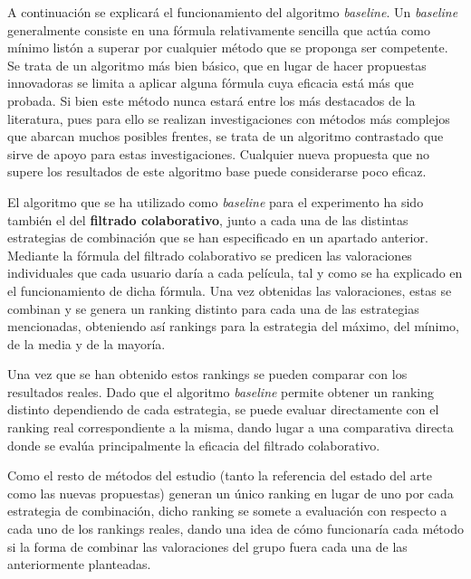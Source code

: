 A continuación se explicará el funcionamiento del algoritmo \textit{baseline}. Un \textit{baseline} generalmente consiste en una fórmula relativamente sencilla que actúa como mínimo listón a superar por cualquier método que se proponga ser competente. Se trata de un algoritmo más bien básico, que en lugar de hacer propuestas innovadoras se limita a aplicar alguna fórmula cuya eficacia está más que probada. Si bien este método nunca estará entre los más destacados de la literatura, pues para ello se realizan investigaciones con métodos más complejos que abarcan muchos posibles frentes, se trata de un algoritmo contrastado que sirve de apoyo para estas investigaciones. Cualquier nueva propuesta que no supere los resultados de este algoritmo base puede considerarse poco eficaz.

El algoritmo que se ha utilizado como \textit{baseline} para el experimento ha sido también el del \textbf{filtrado colaborativo}, junto a cada una de las distintas estrategias de combinación que se han especificado en un apartado anterior. Mediante la fórmula del filtrado colaborativo se predicen las valoraciones individuales que cada usuario daría a cada película, tal y como se ha explicado en el funcionamiento de dicha fórmula. Una vez obtenidas las valoraciones, estas se combinan y se genera un ranking distinto para cada una de las estrategias mencionadas, obteniendo así rankings para la estrategia del máximo, del mínimo, de la media y de la mayoría.

Una vez que se han obtenido estos rankings se pueden comparar con los resultados reales. Dado que el algoritmo \textit{baseline} permite obtener un ranking distinto dependiendo de cada estrategia, se puede evaluar directamente con el ranking real correspondiente a la misma, dando lugar a una comparativa directa donde se evalúa principalmente la eficacia del filtrado colaborativo.

Como el resto de métodos del estudio (tanto la referencia del estado del arte como las nuevas propuestas) generan un único ranking en lugar de uno por cada estrategia de combinación, dicho ranking se somete a evaluación con respecto a cada uno de los rankings reales, dando una idea de cómo funcionaría cada método si la forma de combinar las valoraciones del grupo fuera cada una de las anteriormente planteadas.